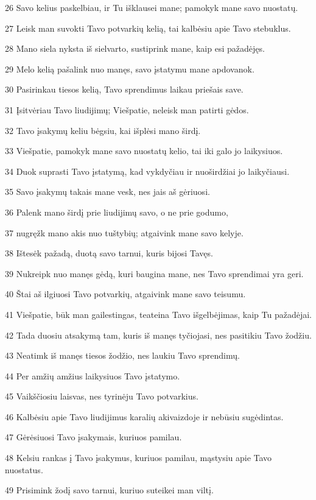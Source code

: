 \par 26 Savo kelius paskelbiau, ir Tu išklausei mane; pamokyk mane savo nuostatų. 
\par 27 Leisk man suvokti Tavo potvarkių kelią, tai kalbėsiu apie Tavo stebuklus. 
\par 28 Mano siela nyksta iš sielvarto, sustiprink mane, kaip esi pažadėjęs. 
\par 29 Melo kelią pašalink nuo manęs, savo įstatymu mane apdovanok. 
\par 30 Pasirinkau tiesos kelią, Tavo sprendimus laikau priešais save. 
\par 31 Įsitvėriau Tavo liudijimų; Viešpatie, neleisk man patirti gėdos. 
\par 32 Tavo įsakymų keliu bėgsiu, kai išplėsi mano širdį. 
\par 33 Viešpatie, pamokyk mane savo nuostatų kelio, tai iki galo jo laikysiuos. 
\par 34 Duok suprasti Tavo įstatymą, kad vykdyčiau ir nuoširdžiai jo laikyčiausi. 
\par 35 Savo įsakymų takais mane vesk, nes jais aš gėriuosi. 
\par 36 Palenk mano širdį prie liudijimų savo, o ne prie godumo, 
\par 37 nugręžk mano akis nuo tuštybių; atgaivink mane savo kelyje. 
\par 38 Ištesėk pažadą, duotą savo tarnui, kuris bijosi Tavęs. 
\par 39 Nukreipk nuo manęs gėdą, kuri baugina mane, nes Tavo sprendimai yra geri. 
\par 40 Štai aš ilgiuosi Tavo potvarkių, atgaivink mane savo teisumu. 
\par 41 Viešpatie, būk man gailestingas, teateina Tavo išgelbėjimas, kaip Tu pažadėjai. 
\par 42 Tada duosiu atsakymą tam, kuris iš manęs tyčiojasi, nes pasitikiu Tavo žodžiu. 
\par 43 Neatimk iš manęs tiesos žodžio, nes laukiu Tavo sprendimų. 
\par 44 Per amžių amžius laikysiuos Tavo įstatymo. 
\par 45 Vaikščiosiu laisvas, nes tyrinėju Tavo potvarkius. 
\par 46 Kalbėsiu apie Tavo liudijimus karalių akivaizdoje ir nebūsiu sugėdintas. 
\par 47 Gėrėsiuosi Tavo įsakymais, kuriuos pamilau. 
\par 48 Kelsiu rankas į Tavo įsakymus, kuriuos pamilau, mąstysiu apie Tavo nuostatus. 
\par 49 Prisimink žodį savo tarnui, kuriuo suteikei man viltį. 
